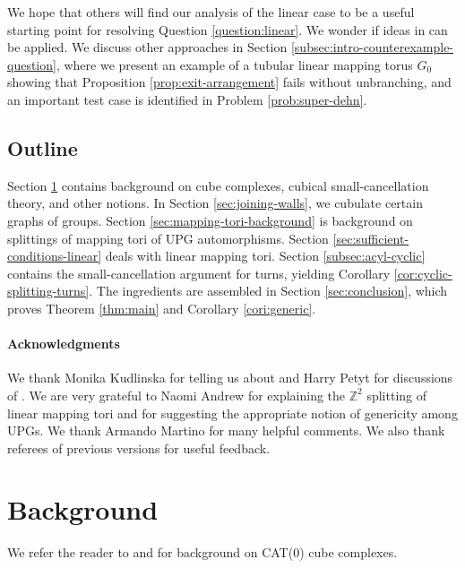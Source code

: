 \documentclass[11pt,oneside]{amsart}
\theoremstyle{definition}
\newcommand{\field}[1]{\mathbb{#1}}
\newcommand{\integers}{\ensuremath{\field{Z}}}
\begin{document}
We hope that others will find our analysis of the linear case to be a useful starting point for resolving Question \ref{question:linear}.  We wonder if ideas in \cite{MerladetMinasyan,Nguyen:separability,WuYe} can be applied.  We discuss other approaches in Section \ref{subsec:intro-counterexample-question}, where we present an example of a tubular linear mapping torus $G_0$ showing that Proposition \ref{prop:exit-arrangement} fails without unbranching, and an important test case is identified in Problem \ref{prob:super-dehn}.

\subsection{Outline}\label{subsec:outline}
Section \ref{sec:cubulation-lemmas} contains background on cube complexes, cubical small-cancellation theory, and other notions.  In Section \ref{sec:joining-walls}, we cubulate certain graphs of groups.  Section \ref{sec:mapping-tori-background} is background on splittings of mapping tori of UPG automorphisms.  Section \ref{sec:sufficient-conditions-linear} deals with linear mapping tori.  Section \ref{subsec:acyl-cyclic} contains the small-cancellation argument for turns, yielding Corollary \ref{cor:cyclic-splitting-turns}.  The ingredients are assembled in Section \ref{sec:conclusion}, which proves Theorem \ref{thm:main} and Corollary \ref{cori:generic}.


\medskip
\paragraph{\textbf{Acknowledgments}}\label{subsec:acknowl}
We thank Monika Kudlinska for telling us about \cite{AndrewMartino:splitting} and   Harry Petyt for discussions of \cite{MunroPetyt}.  We are very grateful to Naomi Andrew for explaining the $\integers^2$ splitting of linear mapping tori and for suggesting the appropriate notion of genericity among UPGs.  We thank Armando Martino for many helpful comments. We also thank referees of previous versions for useful feedback.



\section{Background}\label{sec:cubulation-lemmas}
We refer the reader to \cite[Sec. 2]{Wise:QCH} and \cite{Haglund:semisimple} for background on CAT(0) cube complexes.  
\end{document}
